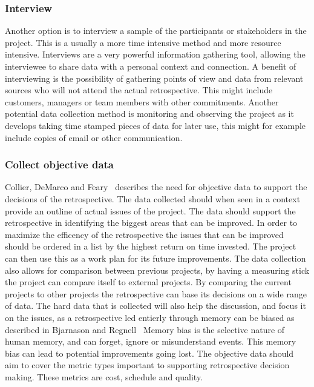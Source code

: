 \documentclass[12pt]{article}
\begin{document}
\subsubsection{Interview} Another option is to interview a sample of the participants or stakeholders in the project. This is a usually a more time intensive method and more resource intensive. Interviews are a very powerful information gathering tool, allowing the interviewee to share data with a personal context and connection. A benefit of interviewing is the possibility of gathering points of view and data from relevant sources who will not attend the actual retrospective. This might include customers, managers or team members with other commitments. Another potential data collection method is monitoring and observing the project as it develops taking time stamped pieces of data for later use, this might for example include copies of email or other communication. 

\subsubsection{Collect objective data} Collier, DeMarco and Feary~\cite{Collier1996} describes the need for objective data to support the decisions of the retrospective. The data collected should when seen in a context provide an outline of actual issues of the project. The data should support the retrospective in identifying the biggest areas that can be improved. In order to maximize the efficency of the retrospective the issues that can be improved should be ordered in a list by the highest return on time invested. The project can then use this as a work plan for its future improvements. The data collection also allows for comparison between previous projects, by having a measuring stick the project can compare itself to external projects. By comparing the current projects to other projects the retrospective can base its decisions on a wide range of data. The hard data that is collected will also help the discussion, and focus it on the issues, as a retrospective led entierly through memory can be biased as described in Bjarnason and Regnell~\cite{Bjarnason2012} Memory bias is the selective nature of human memory, and can forget, ignore or misunderstand events. This memory bias can lead to potential improvements going lost. The objective data should aim to cover the metric types important to supporting retrospective decision making. These metrics are cost, schedule and quality.
\end{document}
